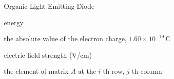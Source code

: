 %
\begin{SymEntry}

\item[OLED]
Organic Light Emitting Diode

\item[$E$]
energy

\item[$e$]
the absolute value of the electron charge, $1.60\times10^{-19}\,\text{C}$

\item[$\mathscr{E}$]
electric field strength (V/cm)

\item[{$A[i,j]$}]
the element of matrix $A$ at the $i$-th row, $j$-th column

\end{SymEntry}
